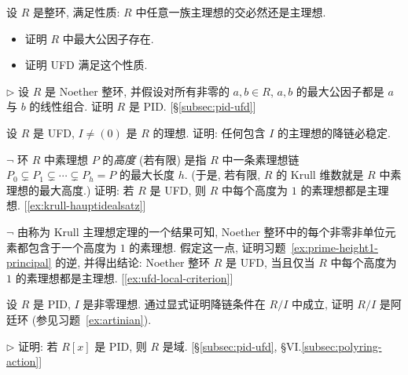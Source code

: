 \begin{prob}
\label{ex:pid-intersection-gcd}
设 $R$ 是整环, 满足性质: $R$ 中任意一族主理想的交必然还是主理想.
\begin{itemize}
\item 证明 $R$ 中最大公因子存在.
\item 证明 UFD 满足这个性质.
\end{itemize}
\end{prob}

\begin{prob}
\label{ex:noeth-linearcomb-pid}
$\triangleright$ 设 $R$ 是 Noether 整环, 并假设对所有非零的 $a,b\in R$, $a,b$ 的最大公因子都是 $a$ 与 $b$ 的线性组合. 证明 $R$ 是 PID. [§\ref{subsec:pid-ufd}]
\end{prob}

\begin{prob}
\label{ex:ufd-descending}
设 $R$ 是 UFD, $I\neq (0)$ 是 $R$ 的理想. 证明: 任何包含 $I$ 的主理想的降链必稳定.
\end{prob}

\begin{prob}
\label{ex:prime-height1-principal}
$\neg$ 环 $R$ 中素理想 $P$ 的\emph{高度} (若有限) 是指 $R$ 中一条素理想链 $P_0\subsetneq P_1\subsetneq\cdots\subsetneq P_h=P$ 的最大长度 $h$. (于是, 若有限, $R$ 的 Krull 维数就是 $R$ 中素理想的最大高度.) 证明: 若 $R$ 是 UFD, 则 $R$ 中每个高度为 $1$ 的素理想都是主理想. [\ref{ex:krull-hauptidealsatz}]
\end{prob}

\begin{prob}
\label{ex:krull-hauptidealsatz}
$\neg$ 由称为 Krull 主理想定理的一个结果可知, Noether 整环中的每个非零非单位元素都包含于一个高度为 $1$ 的素理想. 假定这一点, 证明习题~\ref{ex:prime-height1-principal} 的逆, 并得出结论: Noether 整环 $R$ 是 UFD, 当且仅当 $R$ 中每个高度为 $1$ 的素理想都是主理想. [\ref{ex:ufd-local-criterion}]
\end{prob}

\begin{prob}
\label{ex:pid-artinian-quotient}
设 $R$ 是 PID, $I$ 是非零理想. 通过显式证明降链条件在 $R/I$ 中成立, 证明 $R/I$ 是阿廷环 (参见习题~\ref{ex:artinian}).
\end{prob}

\begin{prob}
\label{ex:rx-pid-field}
$\triangleright$ 证明: 若 $R[x]$ 是 PID, 则 $R$ 是域. [§\ref{subsec:pid-ufd}, §VI.\ref{subsec:polyring-action}]
\end{prob}

